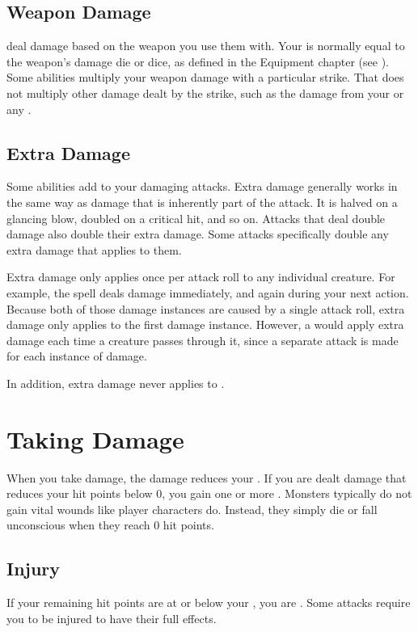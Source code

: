   \subsection{Weapon Damage}\label{Weapon Damage}
     deal damage based on the weapon you use them with.
    Your  is normally equal to the weapon's damage die or dice, as defined in the Equipment chapter (see ).
    Some abilities multiply your weapon damage with a particular strike.
    That does not multiply other damage dealt by the strike, such as the damage from your  or any .

  \subsection{Extra Damage}\label{Extra Damage}
    Some abilities add  to your damaging attacks.
    Extra damage generally works in the same way as damage that is inherently part of the attack.
    It is halved on a glancing blow, doubled on a critical hit, and so on.
    Attacks that deal double damage also double their extra damage.
    Some attacks specifically double any extra damage that applies to them.

    Extra damage only applies once per attack roll to any individual creature.
    For example, the  spell deals damage immediately, and again during your next action.
    Because both of those damage instances are caused by a single attack roll, extra damage only applies to the first damage instance.
    However, a  would apply extra damage each time a creature passes through it, since a separate attack is made for each instance of damage.

    In addition, extra damage never applies to .

\section{Taking Damage}\label{Taking Damage}
  When you take damage, the damage reduces your .
  If you are dealt damage that reduces your hit points below 0, you gain one or more .
  Monsters typically do not gain vital wounds like player characters do.
  Instead, they simply die or fall unconscious when they reach 0 hit points.

  \subsection{Injury}\label{Injury}
    If your remaining hit points are at or below your , you are .
    Some attacks require you to be injured to have their full effects.


